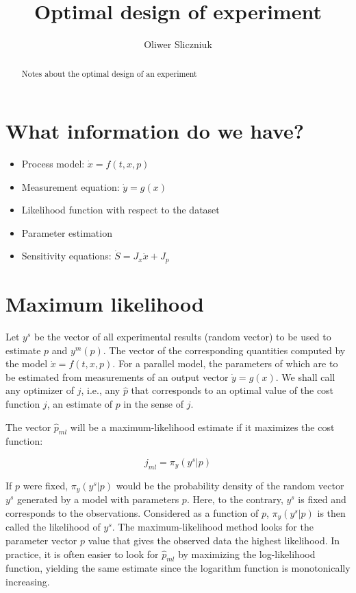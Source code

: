 \documentclass[]{scrartcl}
\title{Optimal design of experiment}
\author{Oliwer Sliczniuk}
\begin{document}
\maketitle

\begin{abstract}
Notes about the optimal design of an experiment
\end{abstract}

\section{What information do we have?}

\begin{itemize}
	\item Process model: $\dot{x}=f(t,x,p)$
	\item Measurement equation: $\dot{y}=g(x)$
	\item Likelihood function with respect to the dataset
	\item Parameter estimation
	\item Sensitivity equations: $\dot{S} = J_x \dot{x} + J_p$
\end{itemize}

\section{Maximum likelihood}
Let $y^s$ be the vector of all experimental results (random vector) to be used to estimate $p$ and $y^m(p)$. The vector of the corresponding quantities computed by the model $\dot{x}=f(t,x,p)$. For a parallel model, the parameters of which are to be estimated from measurements of an output vector $\dot{y}=g(x)$. We shall call any optimizer of $j$, i.e., any $\hat{p}$ that corresponds to an optimal value of the cost function $j$, an estimate of $p$ in the sense of $j$.

The vector $\hat{p}_{ml}$ will be a maximum-likelihood estimate if it maximizes the cost function:

\begin{equation}
	j_{ml} = \pi_y (y^s|p) 
\end{equation}

If $p$ were fixed, $\pi_y(y^s|p)$ would be the probability density of the random vector $y^s$ generated by a model with parameters $p$. Here, to the contrary, $y^s$ is fixed and corresponds to the observations. Considered as a function of $p$, $\pi_y(y^s|p)$ is then called the likelihood of $y^s$. The maximum-likelihood method looks for the parameter vector $p$ value that gives the observed data the highest likelihood. In practice, it is often easier to look for $\hat{p}_{ml}$ by maximizing the log-likelihood function, yielding the same estimate since the logarithm function is monotonically increasing.
\end{document}

